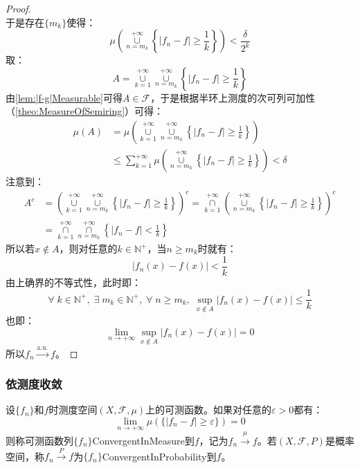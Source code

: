 \begin{proof}
\begin{equation*}
	\end{equation*}
	于是存在$\{m_k\}$使得：
	\begin{equation*}
		\mu\left(\underset{n=m_k}{\overset{+\infty}{\cup}}\left\{|f_n-f|\geqslant\frac{1}{k}\right\}\right)<\frac{\delta}{2^k}
	\end{equation*}
	取：
	\begin{equation*}
		A=\underset{k=1}{\overset{+\infty}{\cup}}\underset{n=m_k}{\overset{+\infty}{\cup}}\left\{|f_n-f|\geqslant\frac{1}{k}\right\}
	\end{equation*}
	由\cref{lem:|f-g|Measurable}可得$A\in \mathscr{F}$，于是根据半环上测度的次可列可加性（\cref{theo:MeasureOfSemiring}）可得：
	\begin{align*}
		\mu(A)&=\mu\left(\underset{k=1}{\overset{+\infty}{\cup}}\underset{n=m_k}{\overset{+\infty}{\cup}}\left\{|f_n-f|\geqslant\frac{1}{k}\right\}\right) \\
		&\leqslant\sum_{k=1}^{+\infty}\mu\left(\underset{n=m_k}{\overset{+\infty}{\cup}}\left\{|f_n-f|\geqslant\frac{1}{k}\right\}\right)<\delta
	\end{align*}
	注意到：
	\begin{align*}
		A^c&=\left(\underset{k=1}{\overset{+\infty}{\cup}}\underset{n=m_k}{\overset{+\infty}{\cup}}\left\{|f_n-f|\geqslant\frac{1}{k}\right\}\right)^c=\underset{k=1}{\overset{+\infty}{\cap}}\left(\underset{n=m_k}{\overset{+\infty}{\cup}}\left\{|f_n-f|\geqslant\frac{1}{k}\right\}\right)^c \\
		&=\underset{k=1}{\overset{+\infty}{\cap}}\underset{n=m_k}{\overset{+\infty}{\cap}}\left\{|f_n-f|<\frac{1}{k}\right\}
	\end{align*}
	所以若$x\notin A$，则对任意的$k\in \mathbb{N}^+$，当$n\geqslant m_k$时就有：
	\begin{equation*}
		|f_n(x)-f(x)|<\frac{1}{k}
	\end{equation*}
	由上确界的不等式性，此时即：
	\begin{equation*}
		\forall\;k\in\mathbb{N}^+,\;\exists\;m_k\in\mathbb{N}^+,\;\forall\;n\geqslant m_k,\;\sup_{x\notin A}|f_n(x)-f(x)|\leqslant\frac{1}{k}
	\end{equation*}
	也即：
	\begin{equation*}
		\lim_{n\to+\infty}\sup_{x\notin A}|f_n(x)-f(x)|=0
	\end{equation*}
	所以$f_n\overset{\text{a.u.}}{\longrightarrow}f$。
\end{proof}
\subsubsection{依测度收敛}
\begin{definition}
	设$\{f_n\}$和$f$时测度空间$(X,\mathscr{F},\mu)$上的可测函数。如果对任意的$\varepsilon>0$都有：
	\begin{equation*}
		\lim_{n\to+\infty}\mu(\{|f_n-f|\geqslant\varepsilon\})=0
	\end{equation*}
	则称可测函数列$\{f_n\}$\gls{ConvergentInMeasure}到$f$，记为$f_n\overset{\mu}{\longrightarrow}f$。若$(X,\mathscr{F},P)$是概率空间，称$f_n\overset{P}{\longrightarrow}f$为$\{f_n\}$\gls{ConvergentInProbability}到$f$。
\end{definition}
